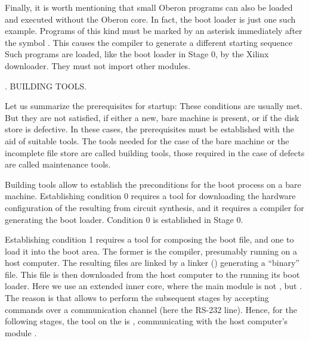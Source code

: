 Finally, it is worth mentioning that small Oberon programs can also be loaded and executed without the Oberon core. In fact, the boot loader is just one such example. Programs of this kind must be marked by an asterisk immediately after the symbol . This causes the compiler to generate a different starting sequence Such programs are loaded, like the boot loader in Stage 0, by the Xilinx downloader. They must not import other modules.

. BUILDING TOOLS.

Let us summarize the prerequisites for startup:
These conditions are usually met. But they are not satisfied, if either a new, bare machine is present, or if the disk store is defective. In these cases, the prerequisites must be established with the aid of suitable tools. The tools needed for the case of the bare machine or the incomplete file store are called building tools, those required in the case of defects are called maintenance tools.

Building tools allow to establish the preconditions for the boot process on a bare machine. Establishing condition 0 requires a tool for downloading the hardware configuration of the  resulting from circuit synthesis, and it requires a compiler for generating the boot loader. Condition 0 is established in Stage 0.

Establishing condition 1 requires a tool for composing the boot file, and one to load it into the boot area. The former is the compiler, presumably running on a host computer. The resulting files are linked by a linker () generating a ``binary'' file. This file is then downloaded from the host computer to the  running its boot loader. Here we use an extended inner core, where the main module is not , but . The reason is that  allows to perform the subsequent stages by accepting commands over a communication channel (here the RS-232 line). Hence, for the following stages, the tool on the  is , communicating with the host computer's module .

